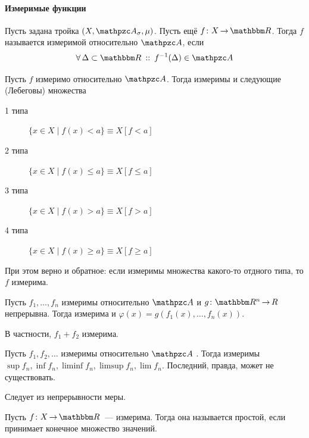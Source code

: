 \documentclass[draft, timbord]{longnotes}
\begin{document}
\paragraph{Измеримые функции}
\label{par:meas::mfun}

\begin{defn}\label{defn:meas::mfun}
  Пусть задана тройка $(X, \alg_\sigma, \mu)$. Пусть ещё $f\colon X \to \R$. Тогда 
  $f$ называется измеримой относительно $\alg$, если 
  \[
    \forall\, \Delta \subset \R  \holds f^{-1} (\Delta) \in \alg
  \]
\end{defn}

\begin{thrm}\label{thrm:meas::mfun::diftyps}
  Пусть $f$ измеримо относительно $\alg$. Тогда измеримы и следующие (Лебеговы) множества
  \begin{description}
    \item[1 типа] $\{x \in X \mid f(x) < a\} \equiv X [f < a]$
    \item[2 типа] $\{x \in X \mid f(x) \leqslant a\} \equiv X [f \leqslant a]$
    \item[3 типа] $\{x \in X \mid f(x) > a\} \equiv X [f > a]$
    \item[4 типа] $\{x \in X \mid f(x) \geqslant a\} \equiv X [f \geqslant a]$
  \end{description}
  При этом верно и обратное: если измеримы множества какого-то отдного типа, то
  $f$ измерима.
\end{thrm}

\begin{thrm}\label{thrm:meas::mfun::sp}
  Пусть $f_1, \dotsc, f_n$ измеримы относительно $\alg$ и $g\colon \R^n \to R$  
  непрерывна. Тогда измерима и $\varphi(x) = g(f_1(x), \dotsc, f_n(x))$.
\end{thrm}
\begin{rem*}
  В частности, $f_1 + f_2$ измерима.
\end{rem*}

\begin{thrm}\label{thrm:meas::mfun::lims}
  Пусть $f_1,f_2, \dotsc $ измеримы относительно $\alg$ .
  Тогда измеримы $\sup f_n, \inf f_n, \liminf f_n, \limsup f_n, \lim f_n $.
  Последний, правда, может не существовать.
\end{thrm}
\begin{tproof}
  Следует из непрерывности меры.
\end{tproof}

\begin{defn}\label{defn:meas::mfun::simp}
  Пусть $f \colon X \to \R$~--- измерима. Тогда она называется простой, если
  принимает конечное множество значений.
\end{defn}
\end{document}
